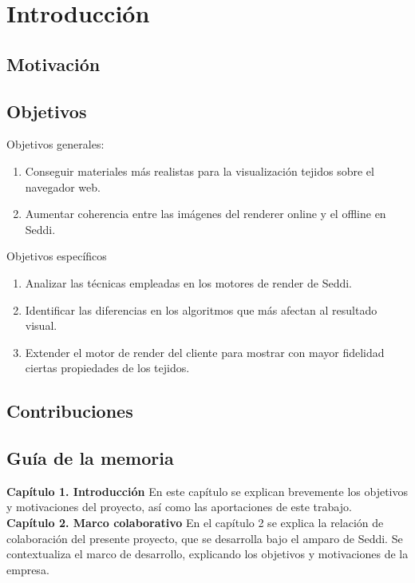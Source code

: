 \chapter{Introducci\'on}

\section{Motivaci\'on}

\section{Objetivos}
Objetivos generales:
\begin{enumerate}
    \item Conseguir materiales m\'as realistas para la visualizaci\'on tejidos sobre el navegador web.
    \item Aumentar coherencia entre las im\'agenes del renderer online y el offline en Seddi.
\end{enumerate}

Objetivos espec\'ificos
\begin{enumerate}
    \item Analizar las t\'ecnicas empleadas en los motores de render de Seddi. 
    \item Identificar las diferencias en los algoritmos que m\'as afectan al resultado visual.
    \item Extender el motor de render del cliente para mostrar con mayor fidelidad ciertas propiedades
          de los tejidos.
  \end{enumerate}

\section{Contribuciones}

\section{Gu\'ia de la memoria}

\textbf{Cap\'itulo 1. Introducci\'on}
En este cap\'itulo se explican brevemente los objetivos y motivaciones del proyecto, as\'i como las aportaciones
de este trabajo.\\

\textbf{Cap\'itulo 2. Marco colaborativo}
En el cap\'itulo 2 se explica la relaci\'on de colaboraci\'on del presente proyecto, que se desarrolla bajo el amparo de Seddi.
Se contextualiza el marco de desarrollo, explicando los objetivos y motivaciones de la empresa.\\

